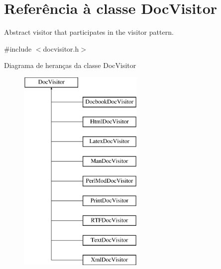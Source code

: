 \hypertarget{class_doc_visitor}{\section{Referência à classe Doc\-Visitor}
\label{class_doc_visitor}
}


Abstract visitor that participates in the visitor pattern.  




{\ttfamily \#include $<$docvisitor.\-h$>$}

Diagrama de heranças da classe Doc\-Visitor\begin{figure}[H]
\begin{center}
\leavevmode
\includegraphics[height=10.000000cm]{class_doc_visitor}
\end{center}
\end{figure}
